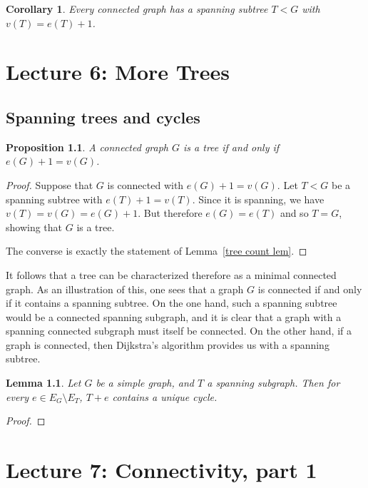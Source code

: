\documentclass[12pt]{report}
\theoremstyle{plain}
\newtheorem{lem}[thm]{Lemma}
\newtheorem{cor}[thm]{Corollary}
\newtheorem{prop}[thm]{Proposition}
\begin{document}
\begin{cor}
Every connected graph has a spanning subtree $T < G$ with $v(T) = e(T) +
1$.
\end{cor}

\chapter{Lecture 6: More Trees}

\section{Spanning trees and cycles}

\begin{prop}
A connected graph $G$ is a tree if and only if $e(G) + 1 = v(G)$.
\end{prop}
\begin{proof}
Suppose that $G$ is connected with $e(G) + 1 = v(G)$.
Let $T < G$ be a spanning subtree with $e(T) + 1 = v(T)$. Since it is
spanning, we have $v(T) = v(G) = e(G) + 1$. But therefore $e(G) = e(T)$ and
so $T = G$, showing that $G$ is a tree.

The converse is exactly the statement of Lemma~\ref{tree count lem}.
\end{proof}

It follows that a tree can be characterized therefore as a minimal
connected graph. As an illustration of this, one sees that a graph $G$ is
connected if and only if it contains a spanning subtree. On the one hand,
such a spanning subtree would be a connected spanning subgraph, and it is
clear that a graph with a spanning connected subgraph must itself be
connected. On the other hand, if a graph is connected, then Dijkstra's
algorithm provides us with a spanning subtree.

\begin{lem}
Let $G$ be a simple graph, and $T$ a spanning subgraph. Then for every $e
\in E_G \setminus E_T$, $T + e$ contains a unique cycle.
\end{lem}
\begin{proof}

\end{proof}

\chapter{Lecture 7: Connectivity, part 1}
\end{document}

